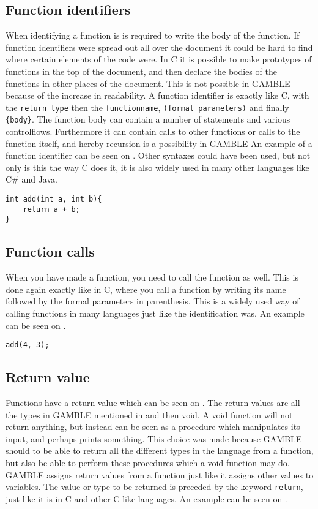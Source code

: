 \subsection*{Function identifiers}
When identifying a function is is required to write the body of the function.
If function identifiers were spread out all over the document it could be hard to find where certain elements of the code were.
In C it is possible to make prototypes of functions in the top of the document, and then declare the bodies of the functions in other places of the document. 
This is not possible in GAMBLE because of the increase in readability.
A function identifier is exactly like C, with the \texttt{return type} then the \texttt{functionname}, \texttt{(formal parameters)} and finally \texttt{\{body\}}.
The function body can contain a number of statements and various controlflows.
Furthermore it can contain calls to other functions or calls to the function itself, and hereby recursion is a possibility in GAMBLE
An example of a function identifier can be seen on .
Other syntaxes could have been used, but not only is this the way C does it, it is also widely used in many other languages like C\# and Java.


\begin{lstlisting}[caption={Function Idemtifier},label={lst:functionID}]                                                        
int add(int a, int b){
	return a + b;
}
\end{lstlisting}

\subsection*{Function calls}
When you have made a function, you need to call the function as well.
This is done again exactly like in C, where you call a function by writing its name followed by the formal parameters in parenthesis.
This is a widely used way of calling functions in many languages just like the identification was.
An example can be seen on .

\begin{lstlisting}[caption={Function Call},label={lst:functionCall}]
add(4, 3);
\end{lstlisting}


\subsection*{Return value}
Functions have a return value which can be seen on .
The return values are all the types in GAMBLE mentioned in  and then void. 
A void function will not return anything, but instead can be seen as a procedure which manipulates its input, and perhaps prints something.
This choice was made because GAMBLE should to be able to return all the different types in the language from a function, but also be able to perform these procedures which a void function may do.
GAMBLE assigns return values from a function just like it assigns other values to variables.
The value or type to be returned is preceded by the keyword \texttt{return}, just like it is in C and other C-like languages.
An example can be seen on .


